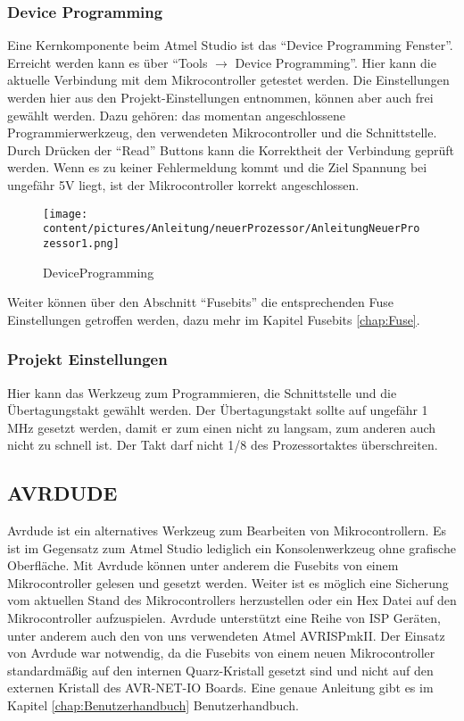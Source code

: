 \subsubsection{Device Programming}
\label{Chap:atmelStudio.Programming}

Eine Kernkomponente beim Atmel Studio ist das "`Device Programming Fenster"'.
Erreicht werden kann es über "`Tools $\to$  Device Programming"'.
Hier kann die aktuelle Verbindung mit dem Mikrocontroller getestet werden. Die
Einstellungen werden hier aus den Projekt-Einstellungen entnommen, können aber
auch frei gewählt werden. Dazu gehören: das momentan
angeschlossene Programmierwerkzeug, den verwendeten Mikrocontroller und die
Schnittstelle. Durch Drücken der "`Read"' Buttons kann die Korrektheit der
Verbindung geprüft werden. Wenn es zu keiner Fehlermeldung kommt und die Ziel
Spannung bei ungefähr 5V liegt, ist der Mikrocontroller korrekt
angeschlossen.

\begin{figure}[H]
\centering
\texttt{[image: content/pictures/Anleitung/neuerProzessor/AnleitungNeuerProzessor1.png]}
\caption{DeviceProgramming}
\label{fig:B3}
\end{figure}

Weiter können über den Abschnitt "`Fusebits"' die entsprechenden Fuse Einstellungen
getroffen werden, dazu mehr im Kapitel Fusebits \ref{chap:Fuse}.


\subsubsection{Projekt Einstellungen}

Hier kann das Werkzeug zum Programmieren, die Schnittstelle und
die Übertagungstakt gewählt werden.
Der Übertagungstakt sollte auf ungefähr 1 MHz gesetzt werden, damit er zum
einen nicht zu langsam, zum anderen auch nicht zu schnell ist. Der Takt darf
nicht 1/8 des Prozessortaktes überschreiten.


\subsection{AVRDUDE}

Avrdude ist ein alternatives Werkzeug zum Bearbeiten von Mikrocontrollern. Es
ist im Gegensatz zum Atmel Studio lediglich ein Konsolenwerkzeug ohne
grafische Oberfläche. Mit Avrdude können unter anderem die Fusebits von einem
Mikrocontroller gelesen und gesetzt werden. Weiter ist es möglich eine Sicherung
vom aktuellen Stand des Mikrocontrollers herzustellen oder ein Hex Datei auf
den Mikrocontroller aufzuspielen. Avrdude unterstützt eine Reihe von \ac{ISP}
Geräten, unter anderem auch den von uns verwendeten Atmel AVRISPmkII. Der Einsatz von
Avrdude war notwendig, da die Fusebits von einem neuen Mikrocontroller
standardmäßig auf den internen Quarz-Kristall gesetzt sind und nicht auf den
externen Kristall des AVR-NET-IO Boards.
Eine genaue Anleitung gibt es im Kapitel \ref{chap:Benutzerhandbuch}
Benutzerhandbuch.

